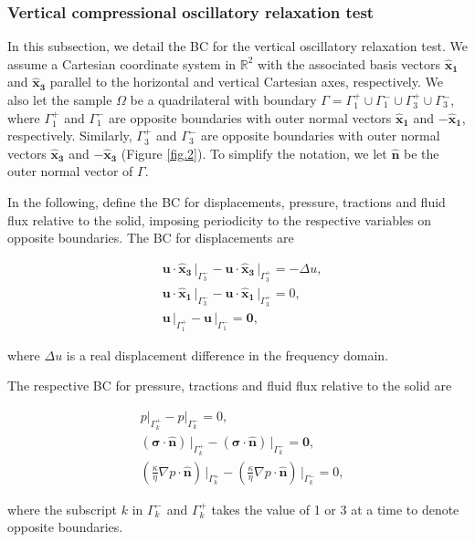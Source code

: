 \documentclass[draft]{agujournal2019}
\begin{document}
\subsubsection{Vertical compressional oscillatory relaxation test}
In this subsection, we detail the BC for the vertical oscillatory relaxation test. We assume a Cartesian coordinate system in $\mathbb R^2$ with the associated basis vectors $\bm{\hat x_1}$ and $\bm{\hat x_3}$ parallel to the horizontal and vertical Cartesian axes, respectively. We also
let the sample $\Omega$ be a quadrilateral with boundary $\Gamma = \Gamma_1^+ \cup \Gamma_1^- \cup \Gamma_3^+ \cup \Gamma_3^- $, where $\Gamma_1^+ $ and $\Gamma_1^- $ are opposite boundaries with outer normal vectors $\bm{\hat x_1}$ and $ -\bm{\hat x_1}$, respectively. Similarly, $\Gamma_3^+ $ and $\Gamma_3^- $ are opposite boundaries with outer normal vectors $\bm{\hat x_3}$ and $ -\bm{\hat x_3}$ (Figure \ref{fig.2}). To simplify the notation, we let $ \bm{\hat n}$ be the outer normal vector
of $\Gamma$.

In the following, define the BC for displacements, pressure, tractions and fluid flux relative to the solid, imposing periodicity to the respective variables on opposite boundaries. 
The BC for displacements are

\begin{linenomath*}
\begin{equation}\label{Eq.8}
\begin{split}
&  \bm{u} \cdot \bm{\hat{x}_3} \, \vert_{\Gamma_3^-} - \bm{u}\cdot \bm{\hat{x}_3}\, \vert_{\Gamma_3^+} =- \Delta u, \\
&  \bm{u} \cdot \bm{\hat{x}_1}\, \vert_{\Gamma_3^-} - \bm{u} \cdot \bm{\hat{x}_1} \, \vert_{\Gamma_3^+} = 0, \\
& \bm{u}\,\vert_{\Gamma_1^+} - \bm{u}\,\vert_{\Gamma_1^-} = \bm{0},
\end{split}
\end{equation}
\end{linenomath*}
where $\Delta u$ is a real displacement difference in the frequency domain.

The respective BC for pressure, tractions and fluid flux relative to the solid are
\begin{linenomath*}
\begin{equation}\label{Eq.9}
\begin{split}
& p\vert_{\Gamma_k^+}-p\vert_{\Gamma_k^-} =0, \\
& \left(\bm{\sigma}\cdot \bm{\hat n} \right)\, \vert_{\Gamma_k^+}-\left(\bm{\sigma}\cdot \bm{\hat n} \right)\, \vert_{\Gamma_k^-} = \bm{0},\\
&\left( \frac{\kappa}{\eta} \nabla p \cdot \bm{\hat n} \right) \, \vert_{\Gamma_k^+} -\left( \frac{\kappa}{\eta} \nabla p \cdot \bm{\hat n} \right) \, \vert_{\Gamma_k^-} = 0,
\end{split}
\end{equation}
\end{linenomath*}
where the subscript $k$ in $\Gamma_k^-$ and $\Gamma_k^+$ takes the value of 1 or 3 at a time to denote opposite boundaries.
\end{document}
